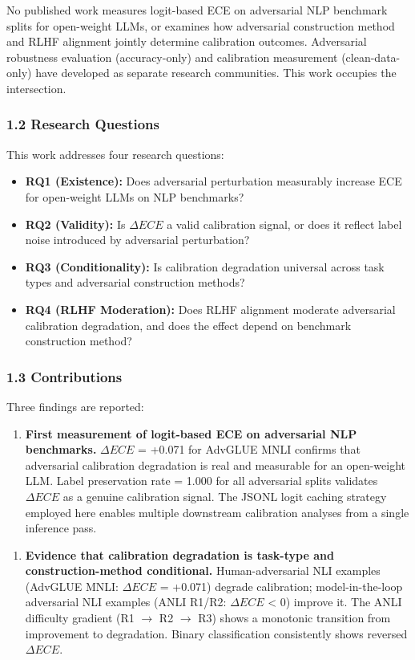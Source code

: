 No published work measures logit-based ECE on adversarial NLP benchmark splits for open-weight LLMs, or examines how adversarial construction method and RLHF alignment jointly determine calibration outcomes. Adversarial robustness evaluation (accuracy-only) and calibration measurement (clean-data-only) have developed as separate research communities. This work occupies the intersection.

\subsubsection{1.2 Research Questions}

This work addresses four research questions:

\begin{itemize}
\item \textbf{RQ1 (Existence):} Does adversarial perturbation measurably increase ECE for open-weight LLMs on NLP benchmarks?
\item \textbf{RQ2 (Validity):} Is $\Delta ECE$ a valid calibration signal, or does it reflect label noise introduced by adversarial perturbation?
\item \textbf{RQ3 (Conditionality):} Is calibration degradation universal across task types and adversarial construction methods?
\item \textbf{RQ4 (RLHF Moderation):} Does RLHF alignment moderate adversarial calibration degradation, and does the effect depend on benchmark construction method?
\end{itemize}

\subsubsection{1.3 Contributions}

Three findings are reported:

\begin{enumerate}
\item \textbf{First measurement of logit-based ECE on adversarial NLP benchmarks.} $\Delta ECE$ = +0.071 for AdvGLUE MNLI confirms that adversarial calibration degradation is real and measurable for an open-weight LLM. Label preservation rate = 1.000 for all adversarial splits validates $\Delta ECE$ as a genuine calibration signal. The JSONL logit caching strategy employed here enables multiple downstream calibration analyses from a single inference pass.
\end{enumerate}

\begin{enumerate}
\item \textbf{Evidence that calibration degradation is task-type and construction-method conditional.} Human-adversarial NLI examples (AdvGLUE MNLI: $\Delta ECE$ = +0.071) degrade calibration; model-in-the-loop adversarial NLI examples (ANLI R1/R2: $\Delta ECE$ < 0) improve it. The ANLI difficulty gradient (R1 $\rightarrow$ R2 $\rightarrow$ R3) shows a monotonic transition from improvement to degradation. Binary classification consistently shows reversed $\Delta ECE$.
\end{enumerate}

